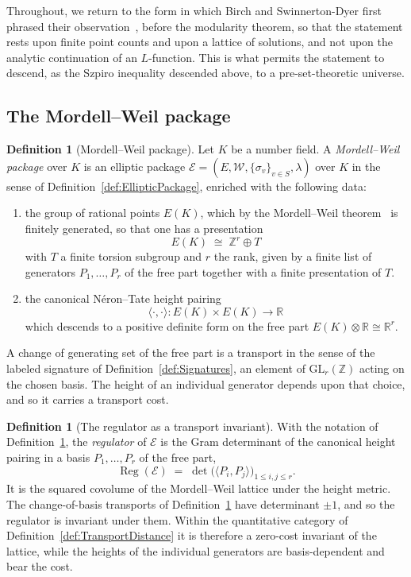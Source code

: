 \documentclass[10pt, reqno]{amsart}
\theoremstyle{plain}
\theoremstyle{definition}
\newtheorem{definition}[theorem]{Definition}
\theoremstyle{plain}
\newcommand{\Z}{\mathbb{Z}}
\newcommand{\R}{\mathbb{R}}
\newcommand{\Reg}{\operatorname{Reg}}
\begin{document}
Throughout, we return to the form in which Birch and Swinnerton-Dyer first phrased their observation~\cite{Birch1965}, before the modularity theorem, so that the statement rests upon finite point counts and upon a lattice of solutions, and not upon the analytic continuation of an $L$-function. This is what permits the statement to descend, as the Szpiro inequality descended above, to a pre-set-theoretic universe.

\subsection{The Mordell--Weil package}\label{subsec:MWPackage}

\begin{definition}[Mordell--Weil package]\label{def:MordellWeilPackage}
Let $K$ be a number field. A \emph{Mordell--Weil package} over $K$ is an elliptic package $\mathcal{E} = (E, \mathcal{W}, \{\sigma_v\}_{v\in S}, \lambda)$ over $K$ in the sense of Definition~\ref{def:EllipticPackage}, enriched with the following data:
\begin{enumerate}
\item[(i)] the group of rational points $E(K)$, which by the Mordell--Weil theorem~\cite{SilvermanAEC} is finitely generated, so that one has a presentation
  \[
    E(K) \;\cong\; \Z^{r} \oplus T
  \]
with $T$ a finite torsion subgroup and $r$ the rank, given by a finite list of generators $P_1, \dots, P_r$ of the free part together with a finite presentation of $T$.
\item[(ii)] the canonical N\'eron--Tate height pairing
  \[
    \langle \cdot, \cdot \rangle \colon E(K) \times E(K) \longrightarrow \R
  \]
which descends to a positive definite form on the free part $E(K) \otimes \R \cong \R^{r}$.
\end{enumerate}
A change of generating set of the free part is a transport in the sense of the labeled signature of Definition~\ref{def:Signatures}, an element of $\mathrm{GL}_r(\Z)$ acting on the chosen basis. The height of an individual generator depends upon that choice, and so it carries a transport cost.
\end{definition}

\begin{definition}[The regulator as a transport invariant]\label{def:RegulatorAsTransport}
With the notation of Definition~\ref{def:MordellWeilPackage}, the \emph{regulator} of $\mathcal{E}$ is the Gram determinant of the canonical height pairing in a basis $P_1, \dots, P_r$ of the free part,
\[
  \Reg(\mathcal{E}) \;=\; \det\bigl( \langle P_i, P_j \rangle \bigr)_{1 \le i,j \le r}.
\]
It is the squared covolume of the Mordell--Weil lattice under the height metric. The change-of-basis transports of Definition~\ref{def:MordellWeilPackage} have determinant $\pm 1$, and so the regulator is invariant under them. Within the quantitative category of Definition~\ref{def:TransportDistance} it is therefore a zero-cost invariant of the lattice, while the heights of the individual generators are basis-dependent and bear the cost.
\end{definition}
\end{document}
